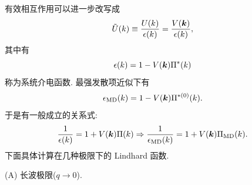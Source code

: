 有效相互作用可以进一步改写成 
\begin{equation}
    \tilde{U}(k)\equiv \frac{U(k)}{\epsilon(k)}=\frac{V(\boldsymbol{k})}{\epsilon(k)},
\end{equation}
其中有 
\begin{equation}
    \epsilon(k)=1-V(\boldsymbol{k})\Pi^*(k)
\end{equation}
称为系统介电函数. 最强发散项近似下有 
\begin{equation}
    \epsilon_{\mathrm{MD}}(k)=1-V(\boldsymbol{k})\Pi^{*(0)}(k).
\end{equation}
于是有一般成立的关系式:
\begin{equation}
    \frac{1}{\epsilon(k)}=1+V(\boldsymbol{k})\Pi(k)\Rightarrow \frac{1}{\epsilon_{\mathrm{MD}}(k)}=1+V(\boldsymbol{k})\Pi_{\mathrm{MD}}(k).
\end{equation}
下面具体计算在几种极限下的 Lindhard 函数.

(A) 长波极限($q\to 0$).

